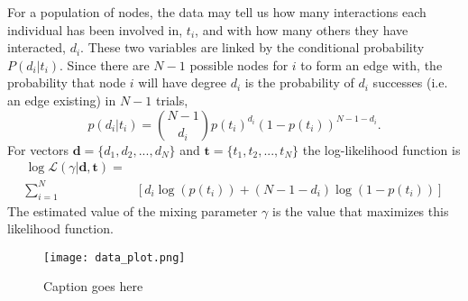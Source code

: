 \documentclass[10pt]{article}
\begin{document}
\begin{multicols}{2}
For a population of nodes, the data may tell us how many interactions each individual has been involved in, $t_{i}$, and with how many others they have interacted, $d_{i}$. These two variables are linked by the conditional probability $P(d_{i}|t_{i})$. Since there are $N-1$ possible nodes for $i$ to form an edge with, the probability that node $i$ will have degree $d_{i}$ is the probability of $d_{i}$ successes (i.e. an edge existing) in $N-1$ trials,
\begin{equation}
p(d_{i}|t_{i})=\binom{N-1}{d_{i}}p(t_{i})^{d_{i}}(1-p(t_{i}))^{N-1-d_{i}}.
\end{equation}
For vectors $\textbf{d}=\{d_{1},d_{2},...,d_{N}\}$ and $\textbf{t}=\{t_{1},t_{2},...,t_{N}\}$ the log-likelihood function is
\begin{equation}
\begin{split}
\log \mathcal{L}(\gamma|\textbf{d},\textbf{t})=&\\
\sum_{i=1}^{N}&\left[d_{i}\log(p(t_{i}))+(N-1-d_{i})\log(1-p(t_{i}))\right]
\end{split}
\end{equation}
The estimated value of the mixing parameter $\gamma$ is the value that maximizes this likelihood function.

\begin{figure}[H]
\texttt{[image: data\_plot.png]}
\caption{Caption goes here}
\end{figure}
\appendix

\end{multicols}
\end{document}
